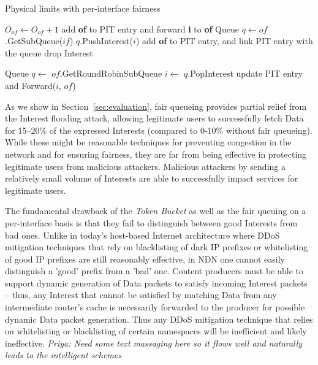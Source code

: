 \begin{algorithm}[h]
\caption{Physical limits with per-interface fairness}
\label{alg:queuing}
\begin{algorithmic}[1]
\State{} 

\vspace{0.2cm}

     
        \State $O_{of} \leftarrow O_{of} + 1$  
        \State add \textbf{of} to PIT entry and forward \textbf{i} to \textbf{of}
    \Else
        \State Queue $q \leftarrow of$.GetSubQueue($if$)
           \State $q$.PushInterest($i$)
           \State add \textbf{of} to PIT entry, and link PIT entry with the queue
        \Else
           \State drop Interest
        \EndIf
    \EndIf
\EndFunction

\vspace{0.2cm}
\State{} 
    \State Queue $q \leftarrow$ $of$.GetRoundRobinSubQueue 
    \State $i \leftarrow$ $q$.PopInterest
    \State update PIT entry and Forward($i$, $of$)
\EndFunction
\end{algorithmic}
\end{algorithm}


As we show in Section~\ref{sec:evaluation}, fair queueing provides partial relief from the Interest flooding attack, allowing legitimate users to successfully fetch Data for 15--20\% of the expressed Interests (compared to 0-10\% without fair queueing). While these might be reasonable techniques for preventing congestion in the network and for ensuring fairness, they are far from being effective in protecting legitimate users from malicious attackers. Malicious attackers by sending a relatively small volume of Interests are able to successfully impact services for legitimate users.

The fundamental drawback of the {\it Token Bucket} as well as the fair queuing on a per-interface basis is that they fail to distinguish between good Interests from bad ones. Unlike in today's host-based Internet architecture where DDoS mitigation techniques that rely on blacklisting of dark IP prefixes or whitelisting of good IP prefixes are still reasonably effective, in NDN one cannot easily distinguish a 'good' prefix from a 'bad' one. Content producers must be able to support dynamic generation of Data packets to satisfy incoming Interest packets -- thus, any  Interest that cannot be satisfied by matching Data from any intermediate router's cache is necessarily forwarded to the producer for possible dynamic Data packet generation. Thus any DDoS mitigation technique that relies on whitelisting or blacklisting of certain namespaces  will be inefficient and likely ineffective. 
{\it Priya: Need some text massaging here so it flows well and naturally leads to the intelligent schemes}



